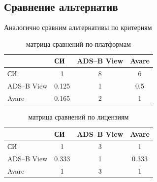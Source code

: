 \documentclass[a4paper,12pt]{report} %
\begin{document}
\subsection{Сравнение альтернатив}

Аналогично сравним альтернативы по критериям

\begin{table}[h]
  \caption{матрица сравнений по платформам}
  \begin{tabular}{l|c|c|c|}
    \cline{2-4}
    {}                               & \multicolumn{1}{l|}{СИ}        & \multicolumn{1}{l|}{ADS--B View} & \multicolumn{1}{l|}{Avare} \\ \hline
    \multicolumn{1}{|l|}{СИ}         & 1                              & 8                               & 6                          \\ \hline
    \multicolumn{1}{|l|}{ADS--B View} & 0.125                          & 1                               & 0.5                        \\ \hline
    \multicolumn{1}{|l|}{Avare}      & 0.165                          & 2                               & 1                          \\ \hline
  \end{tabular}
\end{table}

\begin{table}
  \caption{матрица сравнений по лицензиям}
  \begin{tabular}{l|c|c|c|}
    \cline{2-4}
    {}                               & \multicolumn{1}{l|}{СИ}        & \multicolumn{1}{l|}{ADS--B View} & \multicolumn{1}{l|}{Avare} \\ \hline
    \multicolumn{1}{|l|}{СИ}         & 1                              & 3                               & 1                          \\ \hline
    \multicolumn{1}{|l|}{ADS--B View} & 0.333                          & 1                               & 0.333                      \\ \hline
    \multicolumn{1}{|l|}{Avare}      & 1                              & 3                               & 1                          \\ \hline
  \end{tabular}
\end{table}
\end{document}
